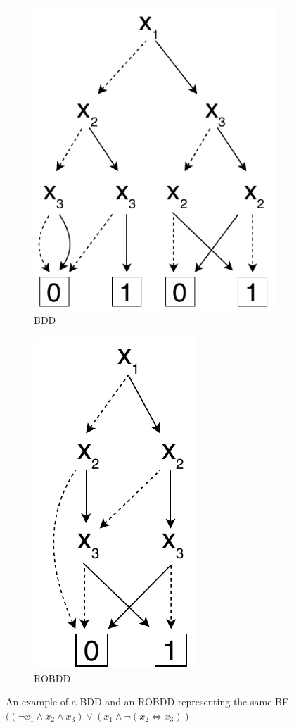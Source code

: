 \documentclass[
  digital, %
  color,
  twoside, %
  table,   %
  nolof,     %
  nolot,     %
]{fithesis3}
\theoremstyle{definition}
\theoremstyle{remark}
\newcommand{\lequal}{\Leftrightarrow}
\begin{document}
\begin{figure}[t]
    \centering
    \begin{subfigure}[b]{.5\linewidth}
        \centering
        \includegraphics[scale=0.7]{figures/bdd1.pdf}
        \caption{BDD}
        \label{fig:BDD}
    \end{subfigure}%
    \begin{subfigure}[b]{.5\linewidth}
        \centering
        \includegraphics[scale=0.7]{figures/bdd2.pdf}
        \caption{ROBDD}
        \label{fig:ROBDD}
    \end{subfigure}
    \caption{An example of a BDD and an ROBDD representing the same BF $((\neg x_1 \land x_2 \land x_3) \lor (x_1 \land \neg (x_2 \lequal x_3))$}
    \label{fig:BDDandROBDD}
\end{figure}
\end{document}
